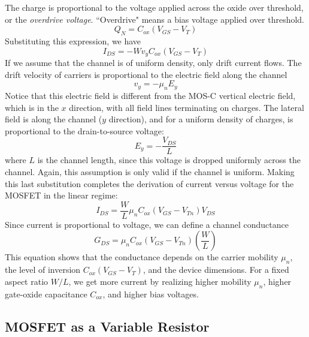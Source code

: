 The charge is proportional to the voltage applied across the oxide over threshold, or the \emph{overdrive voltage}.  ``Overdrive" means a bias voltage applied over threshold.
%
\begin{equation}
	{Q_N} = {C_{ox}}({V_{GS}} - {V_{T}})
\end{equation}
%
Substituting this expression, we have
%
\begin{equation}
	{I_{DS}} =  - W{v_y}{C_{ox}}({V_{GS}} - {V_{T}})
\end{equation}
If we assume that the channel is of uniform density, only drift current flows.  The drift velocity of carriers is proportional to the electric field along the channel
% 
\begin{equation}
	{v_y} =  - {\mu _n}{E_y}
\end{equation}
%
Notice that this electric field is different from the MOS-C vertical electric field, which is in the $x$ direction, with all field lines terminating on charges.  The lateral field is along the channel ($y$ direction), and for a uniform density of charges, is proportional to the drain-to-source voltage:
%
\begin{equation}
	{E_y} =  - \frac{{{V_{DS}}}}{L}
\end{equation}
%
where $L$ is the channel length, since this voltage is dropped uniformly across the channel.  Again, this assumption is only valid if the channel is uniform.  Making this last substitution completes the derivation of current versus voltage for the MOSFET in the linear regime:
%
\begin{equation}
	{I_{DS}} = \frac{W}{L}{\mu _n}{C_{ox}}({V_{GS}} - {V_{Tn}}){V_{DS}}
\end{equation}
%
Since current is proportional to voltage, we can define a channel conductance
%
\begin{equation}
	G_{DS} = {{{\mu _n}{C_{ox}}({V_{GS}} - {V_{Tn}})}}\left( {\frac{W}{L}} \right)
\end{equation}
%
This equation shows that the conductance depends on the carrier mobility $\mu_n$, the level of inversion $C_{ox}(V_{GS}-V_T)$, and the device dimensions. For a fixed aspect ratio $W/L$, we get more current by realizing higher mobility $\mu_n$, higher gate-oxide capacitance $C_{ox}$, and higher bias voltages.  


\subsection{MOSFET as a Variable Resistor}

